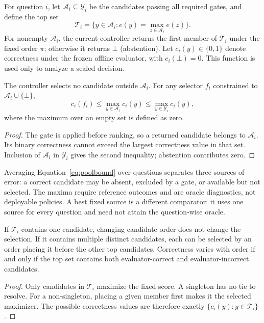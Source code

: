 \documentclass[information,article,submit,moreauthors]{Definitions/mdpi}
\begin{document}
For question $i$, let $\mathcal{A}_i\subseteq\mathcal{Y}_i$ be the candidates passing all required gates, and define the top set
\begin{equation}
\mathcal{T}_i=\{y\in\mathcal{A}_i:e(y)=\max_{z\in\mathcal{A}_i}e(z)\}.
\label{eq:topset}
\end{equation}
For nonempty $\mathcal{A}_i$, the current controller returns the first member of $\mathcal{T}_i$ under the fixed order $\pi$; otherwise it returns $\bot$ (abstention). Let $c_i(y)\in\{0,1\}$ denote correctness under the frozen offline evaluator, with $c_i(\bot)=0$. This function is used only to analyze a sealed decision.

\begin{Proposition}
\label{prop:pool-bound}
The controller selects no candidate outside $\mathcal{A}_i$. For any selector $f_i$ constrained to $\mathcal{A}_i\cup\{\bot\}$,
\begin{equation}
c_i(f_i)\leq \max_{y\in\mathcal{A}_i}c_i(y)
\leq \max_{y\in\mathcal{Y}_i}c_i(y),
\label{eq:poolbound}
\end{equation}
where the maximum over an empty set is defined as zero.
\end{Proposition}
\begin{proof}
The gate is applied before ranking, so a returned candidate belongs to $\mathcal{A}_i$. Its binary correctness cannot exceed the largest correctness value in that set. Inclusion of $\mathcal{A}_i$ in $\mathcal{Y}_i$ gives the second inequality; abstention contributes zero.
\end{proof}

Averaging Equation~\ref{eq:poolbound} over questions separates three sources of error: a correct candidate may be absent, excluded by a gate, or available but not selected. The maxima require reference outcomes and are oracle diagnostics, not deployable policies. A best fixed source is a different comparator: it uses one source for every question and need not attain the question-wise oracle.

\begin{Proposition}
\label{prop:ties}
If $\mathcal{T}_i$ contains one candidate, changing candidate order does not change the selection. If it contains multiple distinct candidates, each can be selected by an order placing it before the other top candidates. Correctness varies with order if and only if the top set contains both evaluator-correct and evaluator-incorrect candidates.
\end{Proposition}
\begin{proof}
Only candidates in $\mathcal{T}_i$ maximize the fixed score. A singleton has no tie to resolve. For a non-singleton, placing a given member first makes it the selected maximizer. The possible correctness values are therefore exactly $\{c_i(y):y\in\mathcal{T}_i\}$.
\end{proof}
\end{document}
